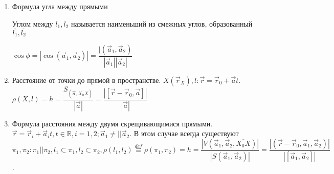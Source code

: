 \begin{enumerate}
	\item Формула угла между прямыми
	\begin{definition}
		Углом между \(l_1, l_2\) называется наименьший из смежных углов, образованный \(\Tilde{l_1}, \Tilde{l_2}\) 
	\end{definition}
	\(\cos \phi = |\cos(\vec a_1, \vec a_2)| = \dfrac{|(\vec a_1, \vec a_2)}{|\vec a_1||\vec a_2|}\)
	\item Расстояние от точки до прямой в пространстве. \(X(\vec r_X), l: \vec r = \vec r_0 + \vec at\). \(\rho(X, l) = h = \dfrac{S_{(\vec a, \overline{X_0X})}}{|\vec a|} = \dfrac{|[\vec r - \vec r_0, \vec a]|}{|\vec a|}\)
	\item Формула расстояния между двумя скрещивающимися прямыми. \(\vec r = \vec r_i +\vec a_it, t\in\mathbb{R}, i = 1, 2; \vec a_1 \ne || \vec a_2\). В этом случае всегда существуют \(\pi_1, \pi_2: \pi_1||\pi_2, l_1\subset\pi_1, l_2\subset\pi_2, \rho(l_1, l_2) \overset{def}{\equiv} \rho(\pi_1, \pi_2) = h = \dfrac{|V(\vec a_1, \vec a_2, \overline{X_0X})|}{|S(\vec a_1, \vec a_2)|} = \dfrac{|(\vec r- \vec r_0, \vec a_1, \vec a_2)|}{|[\vec a_1, \vec a_2]|}\).
\end{enumerate}

